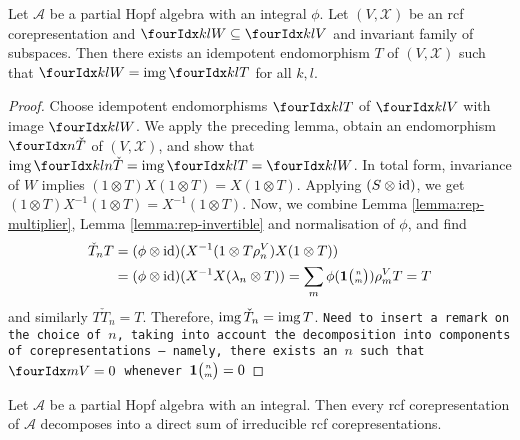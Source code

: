 \begin{Lem}
  Let $\mathscr{A}$ be a partial Hopf algebra with an integral $\phi$.
  Let $(V,\mathscr{X})$ be an rcf corepresentation
  and $\Gru{W}{k}{l} \subseteq \Gru{V}{k}{l}$ and invariant family of
  subspaces. Then there exists an idempotent endomorphism $T$ of
  $(V,\mathscr{X})$ such that $\Gru{W}{k}{l}=\img\Gru{T}{k}{l}$ for
  all $k,l$.
\end{Lem}
\begin{proof}
  Choose idempotent endomorphisms $\Gru{T}{k}{l}$ of $\Gru{V}{k}{l}$
  with image $\Gru{W}{k}{l}$. We apply the preceding lemma, obtain an
  endomorphism $\Grd{\check{T}}{}{n}$ of $(V,\mathscr{X})$, and show
  that $\img \Gr{\check{T}}{k}{l}{}{n} = \img\Gru{T}{k}{l}= \Gru{W}{k}{l}$.   In
  total form, invariance of $W$ implies  $(1 \otimes T)X(1
  \otimes T)=X(1\otimes T)$. Applying
 $(S \otimes \operatorname{id})$, we get   $(1 \otimes T)X^{-1}(1
  \otimes T)=X^{-1}(1\otimes T)$.
Now, we combine  Lemma
  \ref{lemma:rep-multiplier}, Lemma \ref{lemma:rep-invertible} and
  normalisation of $\phi$, and find
  \begin{align*}
    \check{T}_{n} T &= (\phi \otimes \operatorname{id})(X^{-1}(1 \otimes
    T\rho_{n}^{V})X(1 \otimes T)) \\ &=
(\phi \otimes \operatorname{id})(X^{-1}X(\lambda_{n} \otimes T))
 = \sum_{m} \phi(\mathbf{1}{\tiny {\begin{pmatrix} n\\m\end{pmatrix}}}) \rho^{V}_{m}T =T
  \end{align*}
  and similarly $T\check{T}_{n}=T$. Therefore,
  $\operatorname{img}{\check{T}_{n}}=\operatorname{img} T$. \texttt{Need to insert a remark on the
  choice of $n$, taking into account the decomposition into components
of corepresentations --- namely, there exists an $n$ such that
$\Gru{V}{}{m}=0$ whenever $\mathbf{1}{\tiny {\begin{pmatrix} n\\m\end{pmatrix}}}=0$}
\end{proof}
\begin{Prop}  \label{prop:rep-cosemisimple}
  Let $\mathscr{A}$ be a partial Hopf algebra with an integral.  Then
  every rcf corepresentation of $\mathscr{A}$ decomposes into a direct
  sum of irreducible rcf corepresentations.
\end{Prop} 
